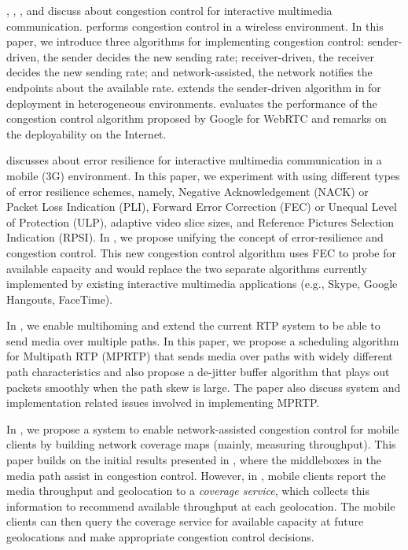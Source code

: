 , , , and 
discuss about congestion control for interactive multimedia communication.
 performs congestion control in a wireless environment. In
this paper, we introduce three algorithms for implementing congestion control:
sender-driven, the sender decides the new sending rate; receiver-driven, the
receiver decides the new sending rate; and network-assisted, the network
notifies the endpoints about the available rate.  extends the
sender-driven algorithm in  for deployment in heterogeneous
environments.  evaluates the performance of the congestion
control algorithm proposed by Google for WebRTC and remarks on the
deployability on the Internet.

 discusses about error resilience for interactive multimedia
communication in a mobile (3G) environment. In this paper, we experiment with
using different types of error resilience schemes, namely, Negative
Acknowledgement (NACK) or Packet Loss Indication (PLI), Forward Error
Correction (FEC) or Unequal Level of Protection (ULP), adaptive video slice
sizes, and Reference Pictures Selection Indication (RPSI). In
, we propose unifying the concept of error-resilience and
congestion control. This new congestion control algorithm uses FEC to probe
for available capacity and would replace the two separate algorithms currently
implemented by existing interactive multimedia applications (e.g., Skype,
Google Hangouts, FaceTime).


In , we enable multihoming and extend the current RTP system
to be able to send media over multiple paths. In this paper, we propose a
scheduling algorithm for Multipath RTP (MPRTP) that sends media over paths
with widely different path characteristics and also propose a de-jitter buffer
algorithm that plays out packets smoothly when the path skew is large. The
paper also discuss system and implementation related issues involved in
implementing MPRTP.

In , we propose a system to enable network-assisted
congestion control for mobile clients by building network coverage maps
(mainly, measuring throughput). This paper builds on the initial results
presented in , where the middleboxes in the media path assist
in congestion control. However, in , mobile clients report
the media throughput and geolocation to a \emph{coverage service}, which
collects this information to recommend available throughput at each
geolocation. The mobile clients can then query the coverage service for
available capacity at future geolocations and make appropriate congestion
control decisions.


